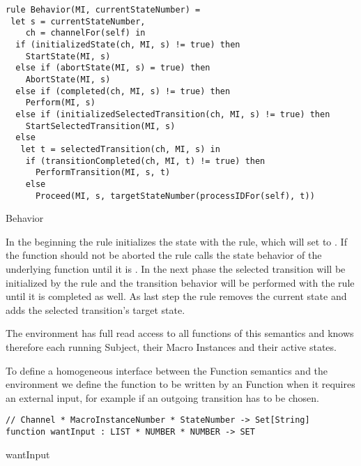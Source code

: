 \begin{listing}[htbp]
\begin{verbatim}
rule Behavior(MI, currentStateNumber) =
 let s = currentStateNumber,
    ch = channelFor(self) in
  if (initializedState(ch, MI, s) != true) then
    StartState(MI, s)
  else if (abortState(MI, s) = true) then
    AbortState(MI, s)
  else if (completed(ch, MI, s) != true) then
    Perform(MI, s)
  else if (initializedSelectedTransition(ch, MI, s) != true) then
    StartSelectedTransition(MI, s)
  else
   let t = selectedTransition(ch, MI, s) in
    if (transitionCompleted(ch, MI, t) != true) then
      PerformTransition(MI, s, t)
    else
      Proceed(MI, s, targetStateNumber(processIDFor(self), t))
\end{verbatim}
\caption{Behavior}
\label{lst:shortasm:Behavior}
\end{listing}


In the beginning the  rule initializes the state with the
 rule, which will set  to
. If the function should not be aborted the 
rule calls the state behavior of the underlying function until it is
.
In the next phase the selected transition will be initialized by the
 rule and the transition behavior will be performed with
the  rule until it is completed as well. As last step
the  rule removes the current state and adds the selected
transition's target state.


The environment has full read access to all functions of this semantics and knows
therefore each running Subject, their Macro Instances and their active states.

To define a homogeneous interface between the Function semantics and the environment we
define the function  to be written by an Function when it
requires an external input, for example if an outgoing transition has to be chosen.



\begin{listing}[htbp]
\begin{verbatim}
// Channel * MacroInstanceNumber * StateNumber -> Set[String]
function wantInput : LIST * NUMBER * NUMBER -> SET
\end{verbatim}
\caption{wantInput}
\label{lst:shortasm:wantInput}
\end{listing}


